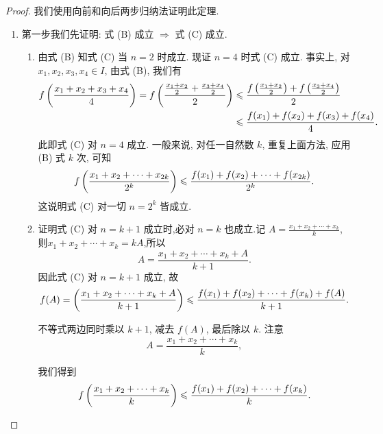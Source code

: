 \begin{proof}
    我们使用向前和向后两步归纳法证明此定理.
    \begin{enumerate}
        \item 第一步我们先证明:
              式 (B) 成立 $\Rightarrow$ 式 (C) 成立.

              \begin{enumerate}
                  \item 由式 (B) 知式 (C) 当 $n=2$ 时成立. 现证 $n=4$ 时式 (C) 成立. 事实上, 对 $x_1, x_2, x_3, x_4 \in I$, 由式 (B), 我们有
                        \begin{align*}
                            f\left( \frac{x_1 + x_2 + x_3 + x_4}{4} \right) = f\left( \frac{\frac{x_1 + x_2}{2} + \frac{x_3 + x_4}{2}}{2} \right) & \leqslant \frac{f\left( \frac{x_1 + x_2}{2} \right) + f\left( \frac{x_3 + x_4}{2} \right)}{2} \\
                                                                                                                                                  & \leqslant \frac{f(x_1) + f(x_2) + f(x_3) + f(x_4)}{4}.
                        \end{align*}
                        此即式 (C) 对 $n=4$ 成立. 一般来说, 对任一自然数 $k$, 重复上面方法, 应用 (B) 式 $k$ 次, 可知
                        \[
                            f\left( \frac{x_1 + x_2 + \cdots + x_{2k}}{2^k} \right) \leqslant \frac{f(x_1) + f(x_2) + \cdots + f(x_{2k})}{2^k}.
                        \]
                        这说明式 (C) 对一切 $n=2^k$ 皆成立.
                  \item 证明式 (C) 对 $n = k + 1$ 成立时,必对 $n = k$ 也成立.记
                        $A = \frac{x_1 + x_2 + \cdots + x_k}{k}$,则$x_1 + x_2 + \cdots + x_k = kA$,所以
                        $$A = \frac{x_1 + x_2 + \cdots + x_k + A}{k+1}.$$
                        因此式 (C) 对 $n = k + 1$ 成立, 故
                        \[
                            f(A) = \left( \frac{x_1 + x_2 + \cdots + x_k + A}{k+1} \right) \leqslant \frac{f(x_1) + f(x_2) + \cdots + f(x_k) + f(A)}{k+1}.
                        \]

                        不等式两边同时乘以 $k + 1$, 减去 $f(A)$, 最后除以 $k$. 注意
                        \[
                            A = \frac{x_1 + x_2 + \cdots + x_k}{k},
                        \]

                        我们得到
                        \[
                            f\left( \frac{x_1 + x_2 + \cdots + x_k}{k} \right) \leqslant \frac{f(x_1) + f(x_2) + \cdots + f(x_k)}{k}.
                        \]


\end{enumerate}
\end{enumerate}
\end{proof}

